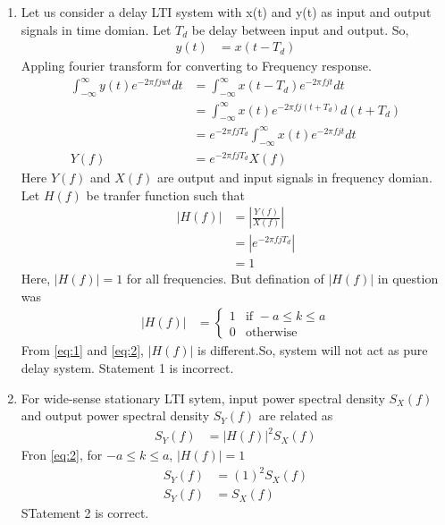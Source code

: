 \documentclass[journal,12pt,twocolumn]{IEEEtran}
\theoremstyle{remark}
\begin{document}
\begin{enumerate}
\item Let us consider a delay LTI system with x(t) and y(t) as input and output signals in time domian. Let $T_d$ be delay between input and output. So,
\begin{align}
y(t)&=x(t-T_d)
\end{align}
Appling fourier transform for converting to Frequency response.
\begin{align}
\int_{-\infty}^{\infty}y(t)e^{-2\pi fjwt}dt&=\int_{-\infty}^{\infty}x(t-T_d)e^{-2\pi fjt}dt\\
&=\int_{-\infty}^{\infty}x(t)e^{-2\pi fj(t+T_d)}d(t+T_d)\\
&=e^{-2\pi fjT_d}\int_{-\infty}^{\infty}x(t)e^{-2\pi fjt}dt\\
Y(f)&=e^{-2\pi fjT_d}X(f)
\end{align}
Here $Y(f)$ and $X(f)$ are output and input signals in frequency domian. Let $H(f)$ be tranfer function such that
\begin{align}
|H(f)|&=\left|\frac{Y(f)}{X(f)}\right|\\
&=\left|e^{-2\pi fjT_d}\right|\\
&=1
\label{eq:1}
\end{align}
Here, $|H(f)|=1$ for all frequencies. But defination of $|H(f)|$ in question was 
\begin{align}
|H(f)| &= 
        \begin{cases}
            1 & \text{if }-a \leq k \leq a\\
            0 & \text{otherwise}
        \end{cases}\label{eq:2}
\end{align}
From \eqref{eq:1} and \eqref{eq:2}, $|H(f)|$ is different.So, system will not act as pure delay system. Statement 1 is incorrect.
\item For wide-sense stationary LTI sytem, input power spectral density $S_X(f)$ and output power spectral density $S_Y(f)$ are related as
\begin{align}
S_Y(f)&=|H(f)|^2S_X(f)
\end{align}
Fron \eqref{eq:2}, for $-a \leq k \leq a$, $|H(f)|=1$
\begin{align}
S_Y(f)&=(1)^2S_X(f)\\
S_Y(f)&=S_X(f)
\end{align}
STatement 2 is correct.
\end{enumerate}
\end{document}
